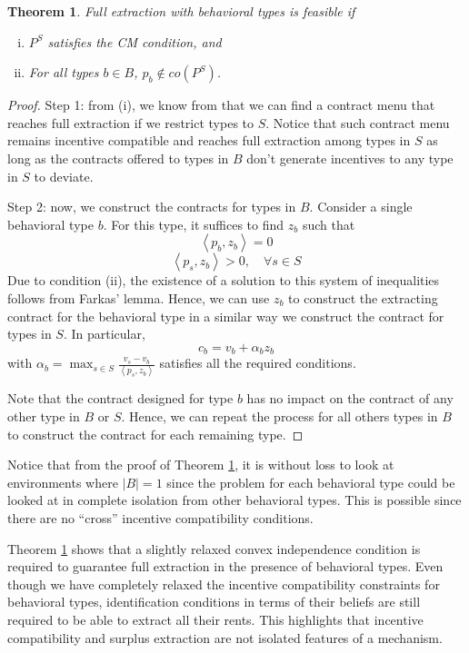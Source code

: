 \documentclass[12pt]{article}
\newtheorem{theorem}{Theorem}
\begin{document}
\begin{theorem}\label{thm}
	Full extraction with behavioral types is feasible if
		\begin{enumerate}[(i)]
			\item $P^S$ satisfies the CM condition, and
			\item For all types $b\in B$, $p_b\not\in co(P^S)$.
		\end{enumerate}
\end{theorem}

\begin{proof}
Step 1: from (i), we know from \citet{cremermclean1988} that we can find a contract menu that reaches full extraction if we restrict types to $S$. Notice that such contract menu remains incentive compatible and reaches full extraction among types in $S$ as long as the contracts offered to types in $B$ don't generate incentives to any type in $S$ to deviate. 

Step 2: now, we construct the contracts for types in $B$. Consider a single behavioral type $b$. For this type, it suffices to find $z_b$ such that 
	\[
		\left<p_b,z_b\right>=0
	\]
	\[
		\left<p_s,z_b\right> > 0,\quad \forall s\in S 	
	\]
Due to condition (ii), the existence of a solution to this system of inequalities follows from Farkas' lemma. Hence, we can use $z_b$ to construct the extracting contract for the behavioral type in a similar way we construct the contract for types in $S$. In particular,
	\[c_b=v_b+\alpha_bz_b\]
with $\alpha_b=\max_{s\in S} \frac{v_s-v_b}{\left<p_s,z_b\right>}$ satisfies all the required conditions. 

Note that the contract designed for type $b$ has no impact on the contract of any other type in $B$ or $S$. Hence, we can repeat the process for all others types in $B$ to construct the contract for each remaining type.

\end{proof}


Notice that from the proof of Theorem \ref{thm}, it is without loss to look at environments where $|B|=1$ since the problem for each behavioral type could be looked at in complete isolation from other behavioral types. This is possible since there are no ``cross'' incentive compatibility conditions. %

Theorem \ref{thm} shows that a slightly relaxed convex independence condition is required to guarantee full extraction in the presence of behavioral types. Even though we have completely relaxed the incentive compatibility constraints for behavioral types, identification conditions in terms of their beliefs are still required to be able to extract all their rents. This highlights that incentive compatibility and surplus extraction are not isolated features of a mechanism. %
\end{document}
